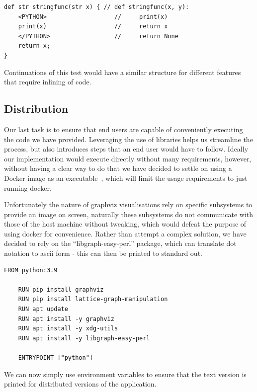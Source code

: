 \begin{lstlisting}[caption={Testing that injections maintain indents},captionpos=b, label={lst:python-indentation-test}]
def str stringfunc(str x) { // def stringfunc(x, y):
    <PYTHON>                   //     print(x)
    print(x)                   //     return x
    </PYTHON>                  //     return None
    return x;
}
\end{lstlisting}

Continuations of this test would have a similar structure for different features that require inlining of code.

\subsection{Distribution}
Our last task is to ensure that end users are capable of conveniently executing the code we have provided.
Leveraging the use of libraries helps us streamline the process, but also introduces steps that an end user would have
to follow.
Ideally our implementation would execute directly without many requirements, however, without having a clear way to do
that we have decided to settle on using a Docker image as an executable~\cite{DockerExec}, which will limit the usage
requirements to just running docker.

Unfortunately the nature of graphviz visualisations rely on specific subsystems to provide an image on screen, naturally
these subsystems do not communicate with those of the host machine without tweaking, which would defeat the purpose of
using docker for convenience.
Rather than attempt a complex solution, we have decided to rely on the ``libgraph-easy-perl'' package, which can
translate dot notation to ascii form - this can then be printed to standard out.

\begin{lstlisting}[caption={The DockerFile used for distribution},captionpos=b,label={lst:dockerfile}]
    FROM python:3.9

    RUN pip install graphviz
    RUN pip install lattice-graph-manipulation
    RUN apt update
    RUN apt install -y graphviz
    RUN apt install -y xdg-utils
    RUN apt install -y libgraph-easy-perl

    ENTRYPOINT ["python"]
\end{lstlisting}

We can now simply use environment variables to ensure that the text version is printed for distributed versions of
the application.
